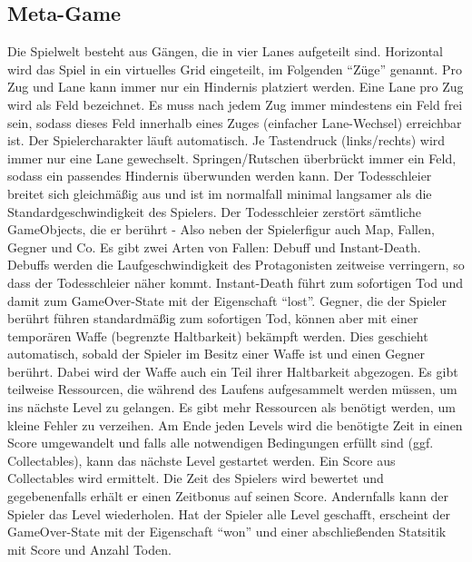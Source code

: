 \documentclass{article}
\begin{document}
\subsection{Meta-Game}

Die Spielwelt besteht aus Gängen, die in vier Lanes aufgeteilt sind. Horizontal wird das
Spiel in ein virtuelles Grid eingeteilt, im Folgenden “Züge” genannt. Pro Zug und Lane kann
immer nur ein Hindernis platziert werden. Eine Lane pro Zug wird als Feld bezeichnet. Es
muss nach jedem Zug immer mindestens ein Feld frei sein, sodass dieses Feld innerhalb eines Zuges (einfacher Lane-Wechsel) erreichbar ist. \newline
Der Spielercharakter läuft automatisch. Je Tastendruck (links/rechts) wird immer nur eine
Lane gewechselt.
Springen/Rutschen überbrückt immer ein Feld, sodass ein passendes Hindernis überwunden
werden kann. \newline
Der Todesschleier breitet sich gleichmäßig aus und ist im normalfall minimal langsamer als
die Standardgeschwindigkeit des Spielers. Der Todesschleier zerstört sämtliche
GameObjects, die er berührt - Also neben der Spielerfigur auch Map, Fallen, Gegner und Co. \newline
Es gibt zwei Arten von Fallen: Debuff und Instant-Death. Debuffs werden die
Laufgeschwindigkeit des Protagonisten zeitweise verringern, so dass der Todesschleier näher
kommt. Instant-Death führt zum sofortigen Tod und damit zum GameOver-State mit der
Eigenschaft “lost”. \newline
Gegner, die der Spieler berührt führen standardmäßig zum sofortigen Tod, können aber mit
einer temporären Waffe (begrenzte Haltbarkeit) bekämpft werden. Dies geschieht
automatisch, sobald der Spieler im Besitz einer Waffe ist und einen Gegner berührt. Dabei
wird der Waffe auch ein Teil ihrer Haltbarkeit abgezogen. \newline
Es gibt teilweise Ressourcen, die während des Laufens aufgesammelt werden müssen, um
ins nächste Level zu gelangen. Es gibt mehr Ressourcen als benötigt werden, um
kleine Fehler zu verzeihen. \newline
Am Ende jeden Levels wird die benötigte Zeit in einen Score umgewandelt und falls alle
notwendigen Bedingungen erfüllt sind (ggf. Collectables), kann das nächste Level gestartet werden. Ein Score aus Collectables wird ermittelt. Die Zeit des Spielers wird bewertet und gegebenenfalls erhält er einen Zeitbonus auf seinen Score.
Andernfalls kann der Spieler das Level wiederholen. \newline
Hat der Spieler alle Level geschafft, erscheint der GameOver-State mit der Eigenschaft “won” und einer abschließenden Statsitik mit Score und Anzahl Toden.
\end{document}
